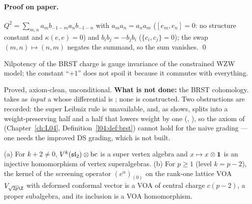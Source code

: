 \paragraph{Proof on paper.} $Q^2 = \sum_{m,n}a_mb_{-1-m}a_nb_{-1-n}$ with $a_ma_n = a_na_m$ ($[e_m,e_n] = 0$:
no structure constant and $\kappa(e,e) = 0$) and $b_ib_j = -b_jb_i$ ($\{c_i,c_j\} = 0$); the swap $(m,n)\mapsto(n,m)$
negates the summand, so the sum vanishes. \qed

\begin{physics}
Nilpotency of the BRST charge is gauge invariance of the constrained WZW model; the constant ``$+1$'' does not
spoil it because it commutes with everything.
\end{physics}

\begin{status}
Proved, axiom-clean, unconditional. \textbf{What is not done:} the BRST cohomology.  takes
as \emph{input} a  whose differential is ; none is constructed. Two obstructions are
recorded: the super Leibniz rule  is unavailable, and, as  shows,
 splits into a weight-preserving half and a half that lowers weight by one
(, ), so the  axiom of  (Chapter~\ref{ch:L04},
Definition~\ref{l04:def:brst}) cannot hold for the naive grading --- one needs the improved DS grading, which is not
built.
\end{status}

\begin{theorem}\label{l19:thm:dsmor}
(a) For $k+2\ne0$, $V^k(\mathfrak{sl}_2)\otimes\mathrm{bc}$ is a super vertex algebra and $x\mapsto x\otimes\mathbf{1}$ is an
injective homomorphism of vertex superalgebras. (b) For $p\ge1$ (level $k = p-2$), the kernel of the screening
operator $(e^{\alpha})_{(0)}$ on the rank-one lattice VOA $V_{\sqrt{2p}\Z}$ with deformed conformal vector is a VOA of
central charge $c(p-2)$, a proper subalgebra, and its inclusion is a VOA homomorphism.
\end{theorem}


